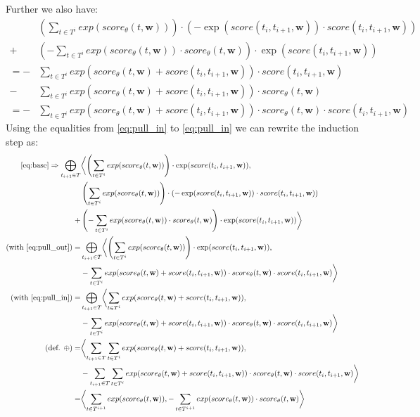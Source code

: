 \documentclass[a4paper,12pt]{ETHexercise}
\begin{document}
Further we also have:
\begin{align}
    &\left( \sum_{t \in T^i} exp(score_\theta(t,\textbf{w})) \right) \cdot (-\exp(score(t_i, t_{i+1}, \textbf{w}))\cdot score(t_i, t_{i+1}, \textbf{w}))\\ 
    + &\left( -\sum_{t \in T^i} exp(score_\theta(t,\textbf{w})) \cdot score_\theta(t,\textbf{w})  \right) \cdot \exp(score(t_i, t_{i+1}, \textbf{w}))\\
    = -&\sum_{t \in T^i} exp(score_\theta(t,\textbf{w})+ score(t_i, t_{i+1}, \textbf{w}))\cdot score(t_i, t_{i+1}, \textbf{w})\\
    - &\sum_{t \in T^i} exp(score_\theta(t,\textbf{w}) + score(t_i, t_{i+1}, \textbf{w})) \cdot score_\theta(t,\textbf{w})\\
    = -&\sum_{t \in T^i} exp(score_\theta(t,\textbf{w})+ score(t_i, t_{i+1}, \textbf{w})) \cdot score_\theta(t,\textbf{w}) \cdot score(t_i, t_{i+1}, \textbf{w}) \label{eq:pull_out}
\end{align}
Using the equalities from \eqref{eq:pull_in} to \eqref{eq:pull_in} we can rewrite the induction step as:
\begin{align}
    \ref{eq:base} \Rightarrow \bigoplus_{t_{i+1} \in T}
    &\biggl< \left( \sum_{t \in T^i} exp(score_\theta(t,\textbf{w})) \right) \cdot \exp(score(t_i, t_{i+1}, \textbf{w})), \\ 
        &\left( \sum_{t \in T^i} exp(score_\theta(t,\textbf{w})) \right) \cdot (-\exp(score(t_i, t_{i+1}, \textbf{w}))\cdot score(t_i, t_{i+1}, \textbf{w}))\\
        + &\left( -\sum_{t \in T^i} exp(score_\theta(t,\textbf{w})) \cdot score_\theta(t,\textbf{w})  \right) \cdot \exp(score(t_i, t_{i+1}, \textbf{w})) \biggr> \\
    (\text{with }\ref{eq:pull_out}) = &\bigoplus_{t_{i+1} \in T}
    \biggl< \left( \sum_{t \in T^i} exp(score_\theta(t,\textbf{w})) \right) \cdot \exp(score(t_i, t_{i+1}, \textbf{w})), \\ 
    &-\sum_{t \in T^i} exp(score_\theta(t,\textbf{w})+ score(t_i, t_{i+1}, \textbf{w})) \cdot score_\theta(t,\textbf{w}) \cdot score(t_i, t_{i+1}, \textbf{w}) \biggr>\\
    (\text{with }\ref{eq:pull_in}) = &\bigoplus_{t_{i+1} \in T}
    \biggl< \sum_{t \in T^i} exp(score_\theta(t,\textbf{w}) + score(t_i, t_{i+1}, \textbf{w})) , \\ 
    &-\sum_{t \in T^i} exp(score_\theta(t,\textbf{w})+ score(t_i, t_{i+1}, \textbf{w})) \cdot score_\theta(t,\textbf{w}) \cdot score(t_i, t_{i+1}, \textbf{w})
    \biggr>\\
    (\text{def. }\oplus) = &\biggl<\sum_{t_{i+1} \in T} \sum_{t \in T^i} exp(score_\theta(t,\textbf{w}) + score(t_i, t_{i+1}, \textbf{w})) , \\ 
    &-\sum_{t_{i+1} \in T}\sum_{t \in T^i} exp(score_\theta(t,\textbf{w})+ score(t_i, t_{i+1}, \textbf{w})) \cdot score_\theta(t,\textbf{w}) \cdot score(t_i, t_{i+1}, \textbf{w})
    \biggr>\\
     = &\biggl<\sum_{t \in T^{i+1}} exp(score_\theta(t,\textbf{w})), -\sum_{t \in T^{i+1}} exp(score_\theta(t,\textbf{w})) \cdot score_\theta(t,\textbf{w})\biggr>
\end{align}
\end{document}
